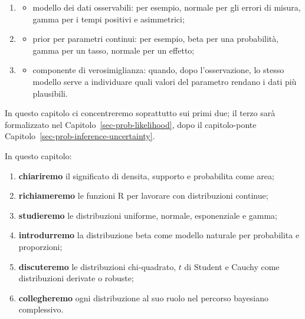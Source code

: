 \documentclass[
  italian,
  letterpaper,
  a4paper,
  11pt,
  open=any]{scrbook}
\providecommand{\tightlist}{%
  \setlength{\itemsep}{0pt}\setlength{\parskip}{0pt}}
\theoremstyle{plain}
\theoremstyle{definition}
\theoremstyle{definition}
\theoremstyle{remark}
\begin{document}
\begin{enumerate}
\def\labelenumi{\arabic{enumi}.}
\tightlist
\item
  \begin{itemize}
  \tightlist
  \item
    modello dei dati osservabili: per esempio, normale per gli errori di
    misura, gamma per i tempi positivi e asimmetrici;\\
  \end{itemize}
\item
  \begin{itemize}
  \tightlist
  \item
    prior per parametri continui: per esempio, beta per una probabilità,
    gamma per un tasso, normale per un effetto;\\
  \end{itemize}
\item
  \begin{itemize}
  \tightlist
  \item
    componente di verosimiglianza: quando, dopo l'osservazione, lo
    stesso modello serve a individuare quali valori del parametro
    rendano i dati più plausibili.
  \end{itemize}
\end{enumerate}

In questo capitolo ci concentreremo soprattutto sui primi due; il terzo
sarà formalizzato nel Capitolo~\ref{sec-prob-likelihood}, dopo il
capitolo-ponte Capitolo~\ref{sec-prob-inference-uncertainty}.

In questo capitolo:

\begin{enumerate}
\def\labelenumi{\arabic{enumi}.}
\tightlist
\item
  \textbf{chiariremo} il significato di densita, supporto e probabilita
  come area;
\item
  \textbf{richiameremo} le funzioni R per lavorare con distribuzioni
  continue;
\item
  \textbf{studieremo} le distribuzioni uniforme, normale, esponenziale e
  gamma;
\item
  \textbf{introdurremo} la distribuzione beta come modello naturale per
  probabilita e proporzioni;
\item
  \textbf{discuteremo} le distribuzioni chi-quadrato, \(t\) di Student e
  Cauchy come distribuzioni derivate o robuste;
\item
  \textbf{collegheremo} ogni distribuzione al suo ruolo nel percorso
  bayesiano complessivo.
\end{enumerate}
\end{document}
